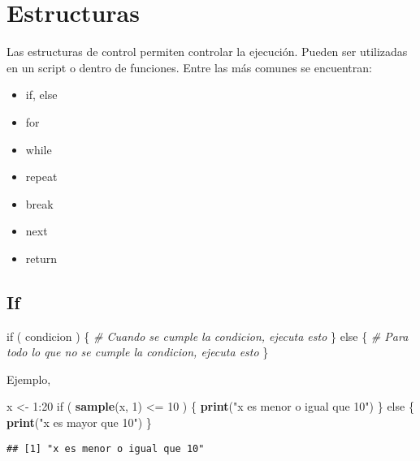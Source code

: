 \documentclass[]{article}
\newenvironment{Shaded}{\begin{snugshade}}{\end{snugshade}}
\newcommand{\KeywordTok}[1]{\textcolor[rgb]{0.13,0.29,0.53}{\textbf{{#1}}}}
\newcommand{\DecValTok}[1]{\textcolor[rgb]{0.00,0.00,0.81}{{#1}}}
\newcommand{\StringTok}[1]{\textcolor[rgb]{0.31,0.60,0.02}{{#1}}}
\newcommand{\CommentTok}[1]{\textcolor[rgb]{0.56,0.35,0.01}{\textit{{#1}}}}
\newcommand{\NormalTok}[1]{{#1}}
\begin{document}
\section{Estructuras}\label{estructuras}

Las estructuras de control permiten controlar la ejecución. Pueden ser
utilizadas en un script o dentro de funciones. Entre las más comunes se
encuentran:

\begin{itemize}
\itemsep1pt\parskip0pt
\item
  if, else
\item
  for
\item
  while
\item
  repeat
\item
  break
\item
  next
\item
  return
\end{itemize}

\subsection{If}\label{if}

\begin{Shaded}
\begin{Highlighting}[]
\NormalTok{if ( condicion ) \{}
  \CommentTok{# Cuando se cumple la condicion, ejecuta esto}
\NormalTok{\} else \{}
  \CommentTok{# Para todo lo que no se cumple la condicion, ejecuta esto}
\NormalTok{\}}
\end{Highlighting}
\end{Shaded}

Ejemplo,

\begin{Shaded}
\begin{Highlighting}[]
\NormalTok{x <-}\StringTok{ }\DecValTok{1}\NormalTok{:}\DecValTok{20}
\NormalTok{if ( }\KeywordTok{sample}\NormalTok{(x, }\DecValTok{1}\NormalTok{) <=}\StringTok{ }\DecValTok{10} \NormalTok{) \{}
  \KeywordTok{print}\NormalTok{(}\StringTok{"x es menor o igual que 10"}\NormalTok{)}
\NormalTok{\} else \{}
  \KeywordTok{print}\NormalTok{(}\StringTok{"x es mayor que 10"}\NormalTok{)}
\NormalTok{\}}
\end{Highlighting}
\end{Shaded}

\begin{verbatim}
## [1] "x es menor o igual que 10"
\end{verbatim}
\end{document}

